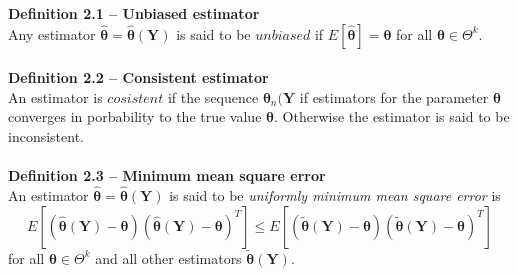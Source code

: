 \documentclass[12pt,a4paper]{report}
\author{Frederik Appel Vardinghus-Nielsen}
\begin{document}
\noindent\textbf{Definition 2.1 -- Unbiased estimator}\\
Any estimator $\hat{\boldsymbol{\theta}}=\hat{\boldsymbol{\theta}}(\mathbf{Y})$ is said to be $unbiased$ if $E[\hat{\boldsymbol{\theta}}]=\boldsymbol{\theta}$ for all $\boldsymbol{\theta}\in\Theta^k$.\\\\
\textbf{Definition 2.2 -- Consistent estimator}\\
An estimator is $cosistent$ if the sequence $\boldsymbol{\theta}_n(\mathbf{Y}$ if estimators for the parameter $\boldsymbol{\theta}$ converges in porbability to the true value $\boldsymbol{\theta}$. Otherwise the estimator is said to be inconsistent.\\\\
\textbf{Definition 2.3 -- Minimum mean square error}\\
An estimator $\hat{\boldsymbol{\theta}}=\hat{\boldsymbol{\theta}}(\mathbf{Y})$ is said to be \textit{uniformly minimum mean square error} is
\begin{equation}
E\left[(\hat{\boldsymbol{\theta}}(\mathbf{Y})-\boldsymbol{\theta})(\hat{\boldsymbol{\theta}}(\mathbf{Y})-\boldsymbol{\theta})^T\right]\leq E\left[(\tilde{\boldsymbol{\theta}}(\mathbf{Y})-\boldsymbol{\theta})(\tilde{\boldsymbol{\theta}}(\mathbf{Y})-\boldsymbol{\theta})^T\right]
\end{equation}
for all $\boldsymbol{\theta}\in\Theta^k$ and all other estimators $\tilde{\boldsymbol{\theta}}(\mathbf{Y})$.
\end{document}
